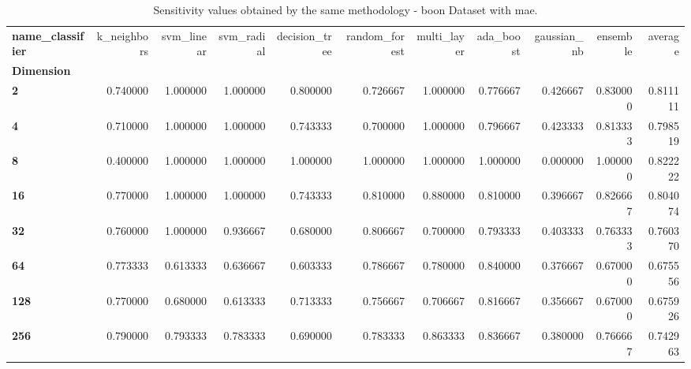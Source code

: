 \begin{table}
\centering
\caption{Sensitivity values obtained by the same methodology - boon Dataset with mae.}
\label{sensitivity_boon_mae-reproduction}
\begin{tabular}{lrrrrrrrrrr}
\toprule
\textbf{name\_classifier} &  k\_neighbors &  svm\_linear &  svm\_radial &  decision\_tree &  random\_forest &  multi\_layer &  ada\_boost &  gaussian\_nb &  ensemble &   average \\
\textbf{Dimension} &              &             &             &                &                &              &            &              &           &           \\
\midrule
\textbf{2        } &     0.740000 &    1.000000 &    1.000000 &       0.800000 &       0.726667 &     1.000000 &   0.776667 &     0.426667 &  0.830000 &  0.811111 \\
\textbf{4        } &     0.710000 &    1.000000 &    1.000000 &       0.743333 &       0.700000 &     1.000000 &   0.796667 &     0.423333 &  0.813333 &  0.798519 \\
\textbf{8        } &     0.400000 &    1.000000 &    1.000000 &       1.000000 &       1.000000 &     1.000000 &   1.000000 &     0.000000 &  1.000000 &  0.822222 \\
\textbf{16       } &     0.770000 &    1.000000 &    1.000000 &       0.743333 &       0.810000 &     0.880000 &   0.810000 &     0.396667 &  0.826667 &  0.804074 \\
\textbf{32       } &     0.760000 &    1.000000 &    0.936667 &       0.680000 &       0.806667 &     0.700000 &   0.793333 &     0.403333 &  0.763333 &  0.760370 \\
\textbf{64       } &     0.773333 &    0.613333 &    0.636667 &       0.603333 &       0.786667 &     0.780000 &   0.840000 &     0.376667 &  0.670000 &  0.675556 \\
\textbf{128      } &     0.770000 &    0.680000 &    0.613333 &       0.713333 &       0.756667 &     0.706667 &   0.816667 &     0.356667 &  0.670000 &  0.675926 \\
\textbf{256      } &     0.790000 &    0.793333 &    0.783333 &       0.690000 &       0.783333 &     0.863333 &   0.836667 &     0.380000 &  0.766667 &  0.742963 \\
\bottomrule
\end{tabular}
\end{table}
